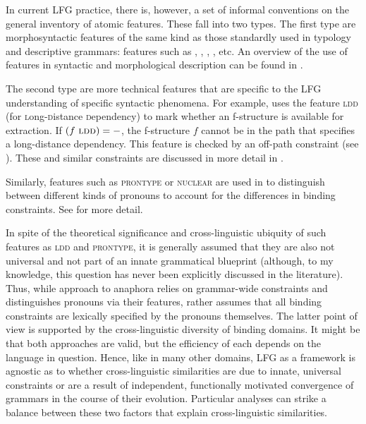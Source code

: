 \documentclass[output=paper,hidelinks]{langscibook}
\begin{document}
 In current LFG practice, there is, however, a set of informal conventions on the general inventory of atomic features. These fall into two types. The first type are morphosyntactic features of the same kind as those standardly used in typology and descriptive grammars: features such as \CASE, \TENSE, \ASP, \PERS, etc. An overview of the use of features in syntactic and morphological description can be found in \textcite{corbett2012}.
 
 The second type are more technical features that are specific to the LFG understanding of specific syntactic phenomena. For example, \textcite[396ff.]{dalrymple01} uses the feature \textsc{ldd} (for \textsc{l}ong-\textsc{d}istance \textsc{d}ependency) to mark whether an f-struc\-ture is available for extraction. If $(f~\textsc{ldd})=-$, the f-structure $f$ cannot be in the path that specifies a long-distance dependency. This feature is checked by an off-path constraint (see ). These and similar constraints are discussed in more detail in .
 
 Similarly, features such as \textsc{prontype} or \textsc{nuclear} are used in \textcite{dalrymple1993,BresnanEtAl2016} to distinguish between different kinds of pronouns to account for the differences in binding constraints. See  for more detail.
 
 In spite of the theoretical significance and cross-linguistic ubiquity of such features as \textsc{ldd} and \textsc{prontype}, it is generally assumed that they are also not universal and not part of an innate grammatical blueprint (although, to my knowledge, this question has never been explicitly discussed in the literature). Thus, while  approach to anaphora relies on grammar-wide constraints and distinguishes pronouns via their features, \textcite{dalrymple1993} rather assumes that all binding constraints are lexically specified by the pronouns themselves. The latter point of view is supported by the cross-linguistic diversity of binding domains. It might be that both approaches are valid, but the efficiency of each depends on the language in question. Hence, like in many other domains, LFG as a framework is agnostic as to whether cross-linguistic similarities are due to innate, universal constraints or are a result of independent, functionally motivated convergence of grammars in the course of their evolution. Particular analyses can strike a balance between these two factors that explain cross-linguistic similarities.%
\end{document}
